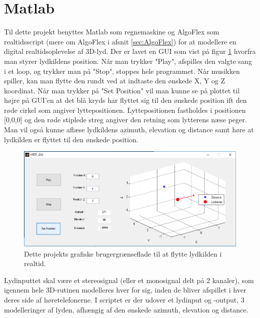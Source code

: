 \section{Matlab}

Til dette projekt benyttes Matlab som regnemaskine og AlgoFlex som realtidsscript (mere om AlgoFlex i afsnit \ref{sec:AlgoFlex}) for at modellere en digital realtidsoplevelse af 3D-lyd. Der er lavet en GUI som vist på figur \ref{fig:gui} hvorfra man styrer lydkildens position. Når man trykker "Play", afspilles den valgte sang i et loop, og trykker man på "Stop", stoppes hele programmet. Når musikken spiller, kan man flytte den rundt ved at indtaste den ønskede X, Y og Z koordinat. Når man trykker på "Set Position" vil man kunne se på plottet til højre på GUI'en at det blå kryds har flyttet sig til den ønskede position ift den røde cirkel som angiver lyttepositionen. Lyttepositionen fastholdes i positionen [0,0,0] og den røde stiplede streg angiver den retning som lytterens næse peger. Man vil også kunne aflæse lydkildens azimuth, elevation og distance samt høre at lydkilden er flyttet til den ønskede position. 

\begin{figure}
	\centering
	\includegraphics[width=1\linewidth]{All_Pics/GUI}
	\caption{Dette projekts grafiske brugergrænseflade til at flytte lydkilden i realtid.}
	\label{fig:gui}
\end{figure}


Lydinputtet skal være et stereosignal (eller et monosignal delt på 2 kanaler), som igennem hele 3D-rutinen modelleres hver for sig, inden de bliver afspillet i hver deres side af høretelefonerne. I scriptet er der udover et lydinput og -output, 3 modelleringer af lyden, afhængig af den ønskede azimuth, elevation og distance. 

